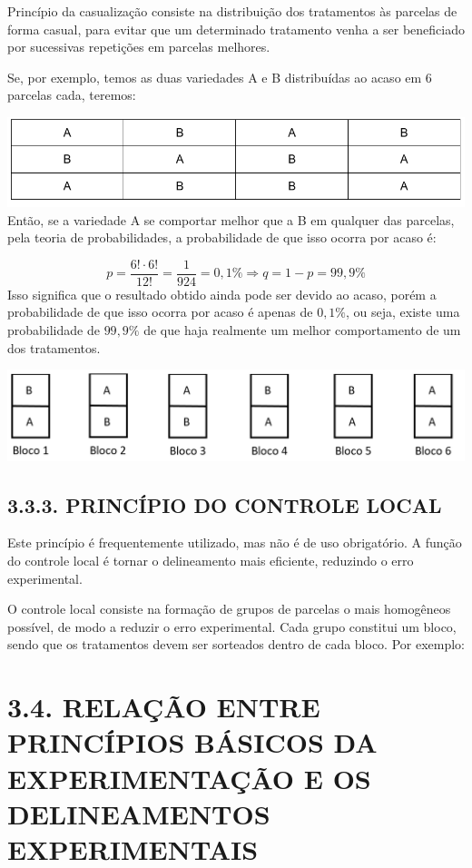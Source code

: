\documentclass[
]{book}
\begin{document}
Princípio da casualização consiste na distribuição dos tratamentos às parcelas de forma casual, para evitar que um determinado tratamento venha a ser beneficiado por sucessivas repetições em parcelas melhores.

Se, por exemplo, temos as duas variedades A e B distribuídas ao acaso em 6 parcelas cada, teremos:

\includegraphics{tab1.png}
Então, se a variedade A se comportar melhor que a B em qualquer das parcelas, pela teoria de probabilidades, a probabilidade de que isso ocorra por acaso é:

\[
p = \frac{6! \cdot 6!}{12!} = \frac{1}{924} = 0,1\% \Rightarrow q=1-p=99,9\%
\]
Isso significa que o resultado obtido ainda pode ser devido ao acaso, porém a probabilidade de que isso ocorra por acaso é apenas de \(0,1\%\), ou seja, existe uma probabilidade de \(99,9\%\) de que haja realmente um melhor comportamento de um dos tratamentos.

\includegraphics{tab2.png}

\hypertarget{princuxedpio-do-controle-local}{%
\subsection{3.3.3. PRINCÍPIO DO CONTROLE LOCAL}\label{princuxedpio-do-controle-local}}

Este princípio é frequentemente utilizado, mas não é de uso obrigatório. A função do controle local é tornar o delineamento mais eficiente, reduzindo o erro experimental.

O controle local consiste na formação de grupos de parcelas o mais homogêneos possível, de modo a reduzir o erro experimental. Cada grupo constitui um bloco, sendo que os tratamentos devem ser sorteados dentro de cada bloco. Por exemplo:

\hypertarget{relauxe7uxe3o-entre-princuxedpios-buxe1sicos-da-experimentauxe7uxe3o-e-os-delineamentos-experimentais}{%
\section{3.4. RELAÇÃO ENTRE PRINCÍPIOS BÁSICOS DA EXPERIMENTAÇÃO E OS DELINEAMENTOS EXPERIMENTAIS}\label{relauxe7uxe3o-entre-princuxedpios-buxe1sicos-da-experimentauxe7uxe3o-e-os-delineamentos-experimentais}}
\end{document}

